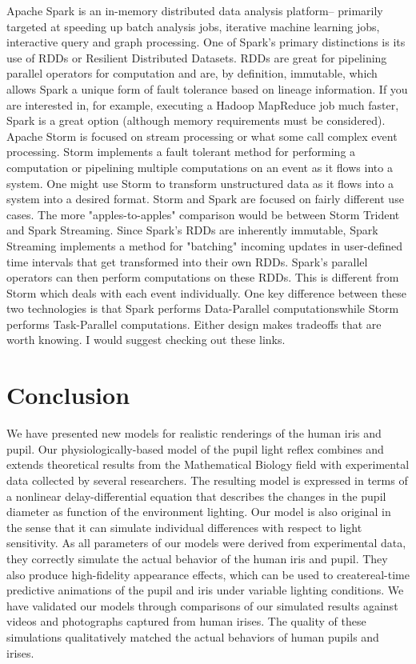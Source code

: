 \documentclass{acmtog} %
\begin{document}
Apache Spark is an in-memory distributed data analysis platform-- primarily targeted at speeding up batch analysis jobs, iterative machine learning jobs, interactive query and graph processing.
One of Spark's primary distinctions is its use of RDDs or Resilient Distributed Datasets. RDDs are great for pipelining parallel operators for computation and are, by definition, immutable, which allows Spark a unique form of fault tolerance based on lineage information. If you are interested in, for example, executing a Hadoop MapReduce job much faster, Spark is a great option (although memory requirements must be considered).
Apache Storm is focused on stream processing or what some call complex event processing. Storm implements a fault tolerant method for performing a computation or pipelining multiple computations on an event as it flows into a system. One might use Storm to transform unstructured data as it flows into a system into a desired format.
Storm and Spark are focused on fairly different use cases. The more "apples-to-apples" comparison would be between Storm Trident and Spark Streaming. Since Spark's RDDs are inherently immutable, Spark Streaming implements a method for "batching" incoming updates in user-defined time intervals that get transformed into their own RDDs. Spark's parallel operators can then perform computations on these RDDs. This is different from Storm which deals with each event individually.
One key difference between these two technologies is that Spark performs Data-Parallel computationswhile Storm performs Task-Parallel computations. Either design makes tradeoffs that are worth knowing. I would suggest checking out these links.

\section{Conclusion}
\label{sec:conclusion}
%
We have presented new models for realistic renderings of the human iris
and pupil. Our physiologically-based model of the pupil light reflex
combines and extends theoretical results from the Mathematical Biology
field with experimental data collected by several researchers. The
resulting model is expressed in terms of a nonlinear delay-differential
equation that describes the changes in the pupil diameter as function of
the environment lighting. Our model is also original in the sense that
it can simulate individual differences with respect to light
sensitivity. As all parameters of our models were derived from
experimental data, they correctly simulate the actual behavior of the
human iris and pupil. They also produce high-fidelity appearance
effects, which can be used to create\break real-time predictive
animations of the pupil and iris under variable lighting conditions. We
have validated our models through comparisons of our simulated results
against videos and photographs captured from human irises. The quality
of these simulations qualitatively matched the actual behaviors of human
pupils and irises.
\end{document}
